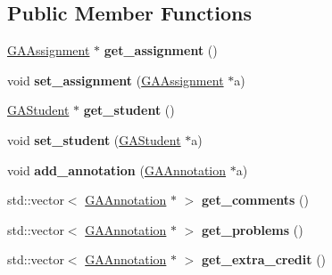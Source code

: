 \subsection*{Public Member Functions}
\begin{DoxyCompactItemize}
\item 
\mbox{\label{class_g_a_assignment_data_a780a6615197aedd52b5949039c5dcec6}} 
\hyperlink{class_g_a_assignment}{G\+A\+Assignment} $\ast$ {\bfseries get\+\_\+assignment} ()
\item 
\mbox{\label{class_g_a_assignment_data_ae03cdaeba3a52203d53464f680ad771b}} 
void {\bfseries set\+\_\+assignment} (\hyperlink{class_g_a_assignment}{G\+A\+Assignment} $\ast$a)
\item 
\mbox{\label{class_g_a_assignment_data_a74258a84379424b3e3f34775651426bf}} 
\hyperlink{class_g_a_student}{G\+A\+Student} $\ast$ {\bfseries get\+\_\+student} ()
\item 
\mbox{\label{class_g_a_assignment_data_adfad0e5c33b77ef03fd654b04d1354d7}} 
void {\bfseries set\+\_\+student} (\hyperlink{class_g_a_student}{G\+A\+Student} $\ast$a)
\item 
\mbox{\label{class_g_a_assignment_data_a04efbb8e93f6e767fd496253920521c2}} 
void {\bfseries add\+\_\+annotation} (\hyperlink{class_g_a_annotation}{G\+A\+Annotation} $\ast$a)
\item 
\mbox{\label{class_g_a_assignment_data_a608a62cbabb5450fc8968f29f69bece0}} 
std\+::vector$<$ \hyperlink{class_g_a_annotation}{G\+A\+Annotation} $\ast$ $>$ {\bfseries get\+\_\+comments} ()
\item 
\mbox{\label{class_g_a_assignment_data_a8e57bebc0847439a72ef18ffe2b7d85d}} 
std\+::vector$<$ \hyperlink{class_g_a_annotation}{G\+A\+Annotation} $\ast$ $>$ {\bfseries get\+\_\+problems} ()
\item 
\mbox{\label{class_g_a_assignment_data_a9f82e8c4ed81e51f2c4086e2748d8c04}} 
std\+::vector$<$ \hyperlink{class_g_a_annotation}{G\+A\+Annotation} $\ast$ $>$ {\bfseries get\+\_\+extra\+\_\+credit} ()

\end{DoxyCompactItemize}

